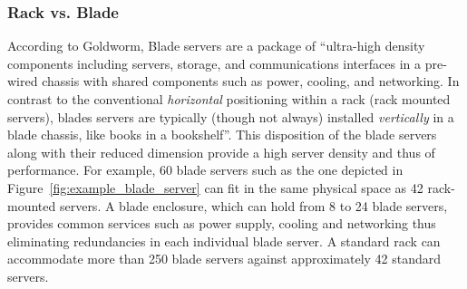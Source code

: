             \subsubsection*{Rack vs. Blade}
                According to Goldworm\cite{barbAnne07}, Blade servers are a package of ``ultra-high density components including servers, storage, and communications interfaces in a pre-wired chassis with shared components such as power, cooling, and networking. In contrast to the conventional \emph{horizontal} positioning within a rack (rack mounted servers), blades servers are typically (though not always) installed \emph{vertically} in a blade chassis, like books in a bookshelf''. This disposition of the blade servers along with their reduced dimension provide a high server density and thus of performance. For example, 60 blade servers such as the one depicted in Figure~\ref{fig:example_blade_server} can fit in the same physical space as 42 rack-mounted servers. A blade enclosure, which can hold from 8 to 24 \cite{Rehn08} blade servers, provides common services such as power supply, cooling and networking thus eliminating redundancies in each individual blade server. A standard rack can accommodate more than 250 blade servers against approximately 42 standard servers.
